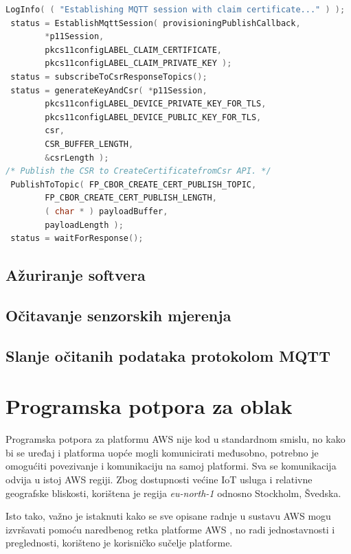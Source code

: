 \begin{lstlisting}[caption={Spajanje certifikatom zahtjeva i zahtjev za novim certifikatom}, language=c]
 LogInfo( ( "Establishing MQTT session with claim certificate..." ) );
 status = EstablishMqttSession( provisioningPublishCallback,
		*p11Session,
		pkcs11configLABEL_CLAIM_CERTIFICATE,
		pkcs11configLABEL_CLAIM_PRIVATE_KEY );
 status = subscribeToCsrResponseTopics();
 status = generateKeyAndCsr( *p11Session,
		pkcs11configLABEL_DEVICE_PRIVATE_KEY_FOR_TLS,
		pkcs11configLABEL_DEVICE_PUBLIC_KEY_FOR_TLS,
		csr,
		CSR_BUFFER_LENGTH,
		&csrLength );
/* Publish the CSR to CreateCertificatefromCsr API. */
 PublishToTopic( FP_CBOR_CREATE_CERT_PUBLISH_TOPIC,
		FP_CBOR_CREATE_CERT_PUBLISH_LENGTH,
		( char * ) payloadBuffer,
		payloadLength );
 status = waitForResponse();
\end{lstlisting}

\subsection{Ažuriranje softvera}

\subsection{Očitavanje senzorskih mjerenja}

\subsection{Slanje očitanih podataka protokolom MQTT}

\section{Programska potpora za oblak}

Programska potpora za platformu AWS nije kod u standardnom smislu, no kako bi se uređaj i platforma uopće mogli komunicirati međusobno, potrebno je omogućiti povezivanje i komunikaciju na samoj platformi. Sva se komunikacija odvija u istoj AWS regiji. Zbog dostupnosti većine IoT usluga i relativne geografske bliskosti, korištena je regija \textit{eu-north-1} odnosno Stockholm, Švedska. 

Isto tako, važno je istaknuti kako se sve opisane radnje u sustavu AWS mogu izvršavati pomoću naredbenog retka platforme AWS , no radi jednostavnosti i preglednosti, korišteno je korisničko sučelje platforme.

